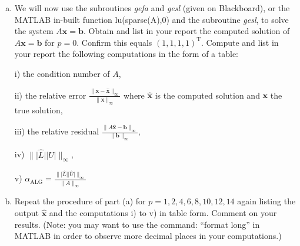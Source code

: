 \documentclass[12pt]{article}
\def\MM#1{\boldsymbol{#1}}
\begin{document}
\begin{enumerate}[(a)] %
\item We will now use the subroutines \emph{gefa} and \emph{gesl} (given on Blackboard), or the MATLAB in-built function lu(sparse(A),0) and the subroutine \emph{gesl}, to solve the system $A\MM{x}=\MM{b}$. Obtain and list in your report the computed solution of $A\MM{x}=\MM{b}$ for $p=0$. Confirm this equals $(1, 1, 1, 1)^\mathrm{T}$. Compute and list in your report the following computations in the form of a table: 

i) the condition number of $A$, 

ii) the relative error $\displaystyle{\frac{\|{\MM{x}-\hat{\MM{x}}}\|_\infty}{\|{\MM{x}}\|_\infty}}$ where $\hat{\MM{x}}$ is the computed solution and $\MM{x}$ the true solution, 

iii) the relative residual $\displaystyle{\frac{\|A\hat{\MM{x}}-\MM{b}\|_\infty}{\|\MM{b}\|_\infty}}$, 

iv) $\displaystyle{\|\lvert \hat{L} \rvert \lvert \hat{U} \rvert} \|_\infty$,

v) $\displaystyle{\alpha_{\mathrm{ALG}} = \frac{\|\lvert \hat{L} \rvert \lvert \hat{U} \rvert \|_\infty}{\|A\|_\infty}}$

\item Repeat the procedure of part (a) for $p = 1, 2, 4, 6, 8, 10, 12, 14$ again listing the output $\hat{\MM{x}}$ and the computations i) to v) in table form. Comment on your results. (Note: you may want to use the command: ``format long'' in MATLAB in order to observe more decimal places in your computations.)

\end{enumerate}
\end{document}
